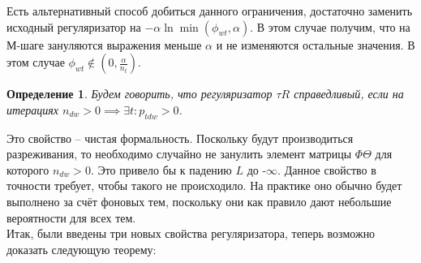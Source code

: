 \documentclass[12pt]{article}
\newtheorem{definition}{Определение}[section]
\begin{document}
Есть альтернативный способ добиться данного ограничения, достаточно заменить исходный регуляризатор на $-\alpha \ln \min(\phi_{wt}, \alpha)$. В этом случае получим, что на М-шаге зануляются выражения меньше $\alpha$ и не изменяются остальные значения. В этом случае $\phi_{wt}\notin (0, \frac{\alpha}{n_t})$.
\begin{definition}
\label{fairreg}
Будем говорить, что регуляризатор $\tau R$ справедливый, если на итерациях $n_{dw} > 0 \implies \exists t\colon p_{tdw} > 0$.
\end{definition}
Это свойство -- чистая формальность. Поскольку будут производиться разреживания, то необходимо случайно не занулить элемент матрицы $\Phi \Theta$ для которого $n_{dw} > 0$. Это привело бы к падению $L$ до -$\infty$.  Данное свойство в точности требует, чтобы такого не происходило. На практике оно обычно будет выполнено за счёт фоновых тем\cite{artmdef2}, поскольку они как правило дают небольшие вероятности для всех тем.\\
Итак, были введены три новых свойства регуляризатора, теперь возможно доказать следующую теорему:
\end{document}
